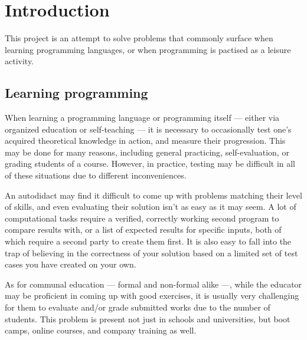 


%

\chapter{Introduction}\label{sect:Intro}

	This project is an attempt to solve problems that commonly surface when learning programming languages, or when programming is pactised as a leisure activity.

	\section{Learning programming}
	
	When learning a programming language or programming itself --- either via organized education or self-teaching --- it is necessary to occasionally test one's acquired theoretical knowledge in action, and measure their progression. This may be done for many reasons, including general practicing, self-evaluation, or grading students of a course. However, in practice, testing may be difficult in all of these situations due to different inconveniences.
	
	An autodidact may find it difficult to come up with problems matching their level of skills, and even evaluating their solution isn't as easy as it may seem. A lot of computational tasks require a verified, correctly working second program to compare results with, or a list of expected results for specific inputs, both of which require a second party to create them first. It is also easy to fall into the trap of believing in the correctness of your solution based on a limited set of test cases you have created on your own.
	
	As for communal education --- formal and non-formal alike ---, while the educator may be proficient in coming up with good exercises, it is usually very challenging for them to evaluate and/or grade submitted works due to the number of students. This problem is present not just in schools and universities, but boot camps, online courses, and company training as well.
	
